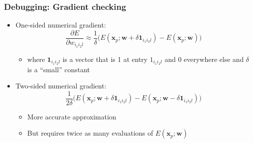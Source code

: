 \documentclass[12pt,notes,mathserif]{beamer}
\begin{document}
\begin{frame}[c]
	\frametitle{Debugging: Gradient checking}
	\begin{itemize}
		\item  One-sided numerical gradient:
		      \[
			      \frac{\partial E}{\partial w_{i_1i_2l}}\approx
			      \frac{1}{\delta}
			      \bigg(E\left(\mathbf{x}_p;\mathbf{w}+\delta\mathbf{1}_{i_1i_2l}\right)-E(\mathbf{x}_p;\mathbf{w})\bigg)
		      \]\vspace*{-5mm}
		      \begin{itemize}
			      \item where $\mathbf{1}_{i_1i_2l}$ is a vector that is 1 at entry $1_{i_1i_2l}$ and 0 everywhere else and $\delta$ is a ``small'' constant
		      \end{itemize}
		\item Two-sided numerical gradient:
		      \[
			      \frac{1}{2\delta}\bigg(E\left(\mathbf{x}_p;\mathbf{w}+\delta\mathbf{1}_{i_1i_2l}\right)-E(\mathbf{x}_p;\mathbf{w}-\delta\mathbf{1}_{i_1i_2l})\bigg)
		      \]\vspace*{-5mm}
		      \begin{itemize}
			      \item More accurate approximation
			      \item But requires twice as many evaluations of $E(\mathbf{x}_p;\mathbf{w})$
		      \end{itemize}
	\end{itemize}
\end{frame}
\end{document}
